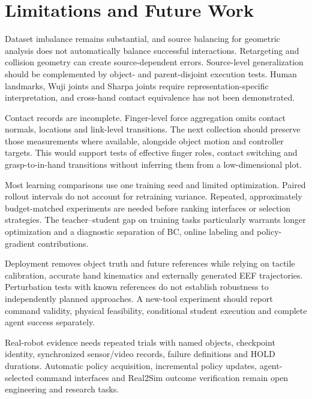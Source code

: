 \documentclass[10pt,twocolumn]{article}
\begin{document}
\section{Limitations and Future Work}

Dataset imbalance remains substantial, and source balancing for geometric analysis does not automatically balance successful interactions. Retargeting and collision geometry can create source-dependent errors. Source-level generalization should be complemented by object- and parent-disjoint execution tests. Human landmarks, Wuji joints and Sharpa joints require representation-specific interpretation, and cross-hand contact equivalence has not been demonstrated.

Contact records are incomplete. Finger-level force aggregation omits contact normals, locations and link-level transitions. The next collection should preserve those measurements where available, alongside object motion and controller targets. This would support tests of effective finger roles, contact switching and grasp-to-in-hand transitions without inferring them from a low-dimensional plot.

Most learning comparisons use one training seed and limited optimization. Paired rollout intervals do not account for retraining variance. Repeated, approximately budget-matched experiments are needed before ranking interfaces or selection strategies. The teacher--student gap on training tasks particularly warrants longer optimization and a diagnostic separation of BC, online labeling and policy-gradient contributions.

Deployment removes object truth and future references while relying on tactile calibration, accurate hand kinematics and externally generated EEF trajectories. Perturbation tests with known references do not establish robustness to independently planned approaches. A new-tool experiment should report command validity, physical feasibility, conditional student execution and complete agent success separately.

Real-robot evidence needs repeated trials with named objects, checkpoint identity, synchronized sensor/video records, failure definitions and HOLD durations. Automatic policy acquisition, incremental policy updates, agent-selected command interfaces and Real2Sim outcome verification remain open engineering and research tasks.

\nocite{qi2023}


\end{document}
